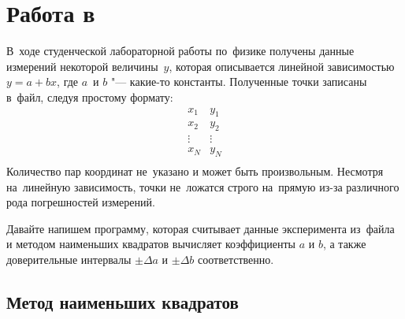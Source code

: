 
\chapter{Работа в }\label{chap:ide}
В~ходе студенческой лабораторной работы по~физике получены данные измерений некоторой величины~\(y\), которая описывается линейной зависимостью \(y = a + bx\), где \(a\)~и \(b\) "--- какие-то константы. Полученные точки записаны в~файл, следуя простому формату:
\[
\begin{array}{ll}
    x_1 & y_1 \\
    x_2 & y_2 \\
    \vdots & \vdots \\
    x_N & y_N \\
\end{array}
\]
Количество пар координат не~указано и может быть произвольным. Несмотря на~линейную зависимость, точки не~ложатся строго на~прямую из-за различного рода погрешностей измерений.

Давайте напишем программу, которая считывает данные эксперимента из~файла и методом наименьших квадратов вычисляет коэффициенты \(a\) и \(b\), а также доверительные интервалы \(\pm\Delta a\) и \(\pm\Delta b\) соответственно.



\section{Метод наименьших квадратов}

